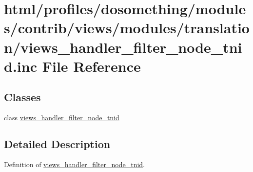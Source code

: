 \hypertarget{views__handler__filter__node__tnid_8inc}{
\section{html/profiles/dosomething/modules/contrib/views/modules/translation/views\_\-handler\_\-filter\_\-node\_\-tnid.inc File Reference}
\label{views__handler__filter__node__tnid_8inc}
}
\subsection*{Classes}
\begin{DoxyCompactItemize}
\item 
class \hyperlink{classviews__handler__filter__node__tnid}{views\_\-handler\_\-filter\_\-node\_\-tnid}
\end{DoxyCompactItemize}


\subsection{Detailed Description}
Definition of \hyperlink{classviews__handler__filter__node__tnid}{views\_\-handler\_\-filter\_\-node\_\-tnid}. 
